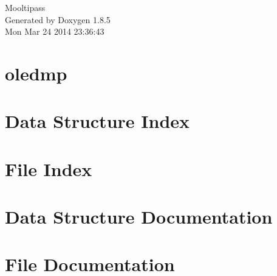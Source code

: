 \documentclass[twoside]{book}
\newcommand{\clearemptydoublepage}{%
  \newpage{\pagestyle{empty}\cleardoublepage}%
}
\begin{document}
\hypersetup{pageanchor=false}
\begin{titlepage}
\vspace*{7cm}
\begin{center}%
{\Large Mooltipass }\\
\vspace*{1cm}
{\large Generated by Doxygen 1.8.5}\\
\vspace*{0.5cm}
{\small Mon Mar 24 2014 23:36:43}\\
\end{center}
\end{titlepage}
\clearemptydoublepage
\tableofcontents
\clearemptydoublepage
{}
\hypersetup{pageanchor=true}

\chapter{oledmp}
\label{md_src_lib_oledmp_8arduino__r_e_a_d_m_e}
\hypertarget{md_src_lib_oledmp_8arduino__r_e_a_d_m_e}{}

\chapter{Data Structure Index}

\chapter{File Index}

\chapter{Data Structure Documentation}












\chapter{File Documentation}
























\newpage
{}
{}
\printindex
\end{document}
